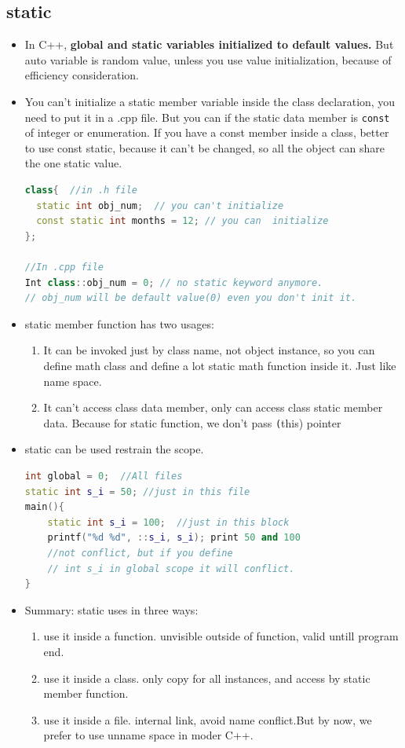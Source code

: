 \documentclass[a4paper,12pt,twoside]{book}
\begin{document}
\subsection{static}
\begin{itemize}
	\item In C++, \textbf{global and static variables initialized to default values.}  But auto variable is random value, unless you use value initialization, because of efficiency consideration. 

	\item You can't initialize a static member variable inside the class declaration, you need to put it in a .cpp file.   But you can if the static data member is \texttt{const} of integer or enumeration. If you have a const member inside a class, better to use const static, because it can't be changed, so all the object can share the one static value.
\begin{lstlisting}[frame=single, language=c++]
class{  //in .h file
  static int obj_num;  // you can't initialize
  const static int months = 12; // you can  initialize
};

//In .cpp file
Int class::obj_num = 0; // no static keyword anymore.
// obj_num will be default value(0) even you don't init it.
\end{lstlisting}

	\item static member function has two usages:
\begin{enumerate}
	\item It can be invoked just by class name, not object instance, so you can define math class and define a lot static math function inside it.  Just like name space.
	\item It can't access class data member, only can access class static member data. Because for static function, we don't pass \texttt(this) pointer
\end{enumerate}

	\item static can be used restrain the scope.
\begin{lstlisting}[frame=single, language=c++]
int global = 0;  //All files
static int s_i = 50; //just in this file
main(){
    static int s_i = 100;  //just in this block
    printf("%d %d", ::s_i, s_i); print 50 and 100
    //not conflict, but if you define 
    // int s_i in global scope it will conflict. 
}
\end{lstlisting}

	\item Summary: static uses in three ways:
\begin{enumerate}
	\item use it inside a function. unvisible outside of function, valid untill program end.
	\item use it inside a class. only copy for all instances, and access by static member function.
	\item use it inside a file. internal link, avoid name conflict.But by now, we prefer to use unname space in moder C++.
\end{enumerate}
\end{itemize}
\end{document}
